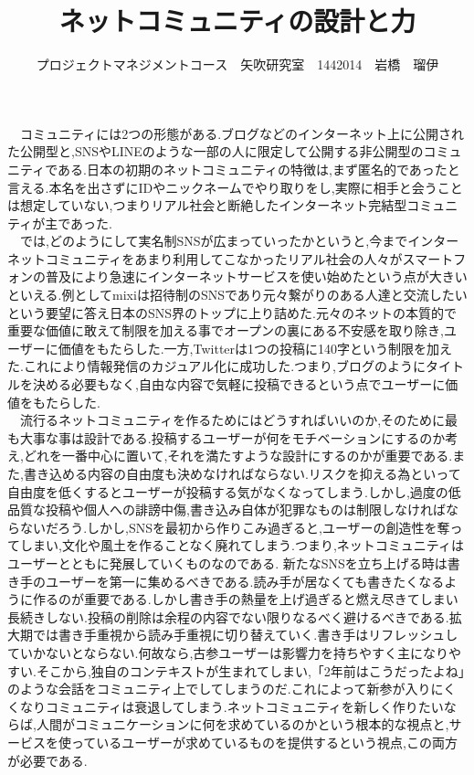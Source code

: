 \documentclass[uplatex,twocolumn,dvipdfmx]{jsarticle}
\title{\vspace{-5mm}\fontsize{14pt}{0pt}\selectfont ネットコミュニティの設計と力}
\author{\normalsize プロジェクトマネジメントコース　矢吹研究室　1442014　岩橋　瑠伊}
\date{}
\begin{document}
\fontsize{10.5pt}{\baselineskip}\selectfont
\maketitle





　コミュニティには2つの形態がある.ブログなどのインターネット上に公開された公開型と,SNSやLINEのような一部の人に限定して公開する非公開型のコミュニティである.日本の初期のネットコミュニティの特徴は,まず匿名的であったと言える.本名を出さずにIDやニックネームでやり取りをし,実際に相手と会うことは想定していない,つまりリアル社会と断絶したインターネット完結型コミュニティが主であった.\\
　では,どのようにして実名制SNSが広まっていったかというと,今までインターネットコミュニティをあまり利用してこなかったリアル社会の人々がスマートフォンの普及により急速にインターネットサービスを使い始めたという点が大きいといえる.例としてmixiは招待制のSNSであり元々繋がりのある人達と交流したいという要望に答え日本のSNS界のトップに上り詰めた.元々のネットの本質的で重要な価値に敢えて制限を加える事でオープンの裏にある不安感を取り除き,ユーザーに価値をもたらした.一方,Twitterは1つの投稿に140字という制限を加えた.これにより情報発信のカジュアル化に成功した.つまり,ブログのようにタイトルを決める必要もなく,自由な内容で気軽に投稿できるという点でユーザーに価値をもたらした.\\
　流行るネットコミュニティを作るためにはどうすればいいのか,そのために最も大事な事は設計である.投稿するユーザーが何をモチベーションにするのか考え,どれを一番中心に置いて,それを満たすような設計にするのかが重要である.また,書き込める内容の自由度も決めなければならない.リスクを抑える為といって自由度を低くするとユーザーが投稿する気がなくなってしまう.しかし,過度の低品質な投稿や個人への誹謗中傷,書き込み自体が犯罪なものは制限しなければならないだろう.しかし,SNSを最初から作りこみ過ぎると,ユーザーの創造性を奪ってしまい,文化や風土を作ることなく廃れてしまう.つまり,ネットコミュニティはユーザーとともに発展していくものなのである.
新たなSNSを立ち上げる時は書き手のユーザーを第一に集めるべきである.読み手が居なくても書きたくなるように作るのが重要である.しかし書き手の熱量を上げ過ぎると燃え尽きてしまい長続きしない.投稿の削除は余程の内容でない限りなるべく避けるべきである.拡大期では書き手重視から読み手重視に切り替えていく.書き手はリフレッシュしていかないとならない.何故なら,古参ユーザーは影響力を持ちやすく主になりやすい.そこから,独自のコンテキストが生まれてしまい,「2年前はこうだったよね」のような会話をコミュニティ上でしてしまうのだ.これによって新参が入りにくくなりコミュニティは衰退してしまう.ネットコミュニティを新しく作りたいならば,人間がコミュニケーションに何を求めているのかという根本的な視点と,サービスを使っているユーザーが求めているものを提供するという視点,この両方が必要である.\\
\end{document}
